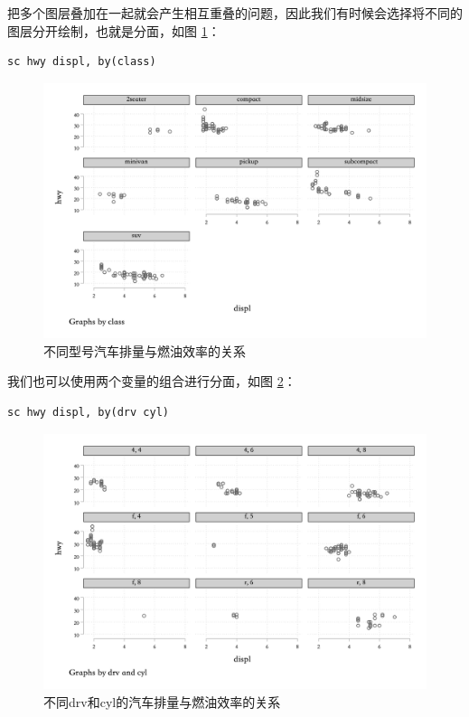 把多个图层叠加在一起就会产生相互重叠的问题，因此我们有时候会选择将不同的图层分开绘制，也就是分面，如图 \ref{fig:hwydisplbyclass}：

\begin{lstlisting}
sc hwy displ, by(class)
\end{lstlisting}

\begin{figure}[htbp]
  \centering
  \includegraphics[width=1\textwidth]{assets/hwydisplbyclass.png}
  \caption{不同型号汽车排量与燃油效率的关系}
  \label{fig:hwydisplbyclass}
\end{figure}

我们也可以使用两个变量的组合进行分面，如图 \ref{fig:hwydisplbyfrvcyl}：

\begin{lstlisting}
sc hwy displ, by(drv cyl)
\end{lstlisting}

\begin{figure}[htbp]
  \centering
  \includegraphics[width=1\textwidth]{assets/hwydisplbyfrvcyl.png}
  \caption{不同drv和cyl的汽车排量与燃油效率的关系}
  \label{fig:hwydisplbyfrvcyl}
\end{figure}

